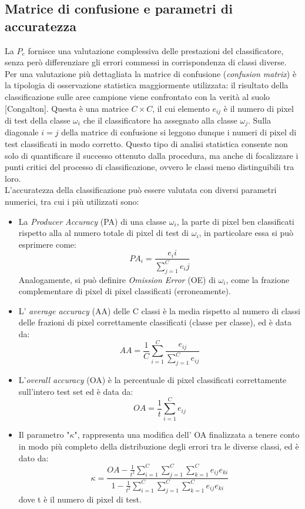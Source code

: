 \subsection{Matrice di confusione e parametri di accuratezza}
La $P_e$ fornisce una valutazione complessiva delle prestazioni del classificatore, senza però differenziare gli errori commessi in corrispondenza di classi diverse. Per una valutazione più dettagliata la matrice di confusione (\emph{confusion matrix}) è la tipologia di osservazione statistica maggiormente utilizzata: il risultato della classificazione sulle aree campione viene confrontato con la verità al suolo [Congalton]. Questa è una matrice $C \times C$, il cui elemento $e_{ij}$ è il numero di pixel di test della classe $\omega_i$ che il classificatore ha assegnato alla classe $\omega_j$. Sulla diagonale $i=j$ della matrice di confusione si leggono dunque i numeri di pixel di test classificati in modo corretto. Questo tipo di analisi statistica consente non solo di quantificare il successo ottenuto dalla procedura, ma anche di focalizzare i punti critici del processo di classificazione, ovvero le classi meno distinguibili tra loro. \\
L'accuratezza della classificazione può essere valutata con diversi parametri numerici, tra cui i più utilizzati sono:
\begin{itemize}
\item La \emph{Producer Accuracy} (PA) di una classe $\omega_i$, la
parte di pixel ben classificati rispetto alla al numero totale di
pixel di test di $\omega_i$, in particolare essa si può esprimere
come:
\begin{equation}
\label{eq:PA}
PA_i=\dfrac{e_ii}{\sum_{j=1}^Ce_ij}
\end{equation}
Analogamente, si può definire \emph{Omission Error} (OE) di $\omega_i$, come la frazione complementare di pixel di pixel classificati (erroneamente).
\item L' \emph{average accuracy} (AA) delle C classi è la media rispetto al numero di classi delle frazioni di pixel correttamente classificati (classe per classe), ed è data da:
\begin{equation}
\label{eq:AA}
AA=\dfrac{1}{C}\sum_{i=1}^C\dfrac{e_{ij}}{\sum_{j=1}^C e_{ij}}
\end{equation}
\item L'\emph{overall accuracy }(OA) è la percentuale di pixel classificati correttamente sull'intero test set ed è data da:
\begin{equation}
\label{eq:OA}
OA= \dfrac{1}{t}\sum_{i=1}^C e_{ij}
\end{equation}
\item Il parametro "$\kappa$", rappresenta una modifica dell' OA finalizzata a tenere conto in modo più completo della distribuzione degli errori tra le diverse classi, ed è dato da:
\begin{equation}
\label{eq:K}
\kappa=\dfrac{OA-\frac{1}{t^2}\sum_{i=1}^C\sum_{j=1}^C\sum_{k=1}^C e_{ij}e_{ki}}{1-\frac{1}{t^2}\sum_{i=1}^C\sum_{j=1}^C\sum_{k=1}^C e_{ij} e_{ki}}
\end{equation}
dove t è il numero di pixel di test.
\end{itemize}


